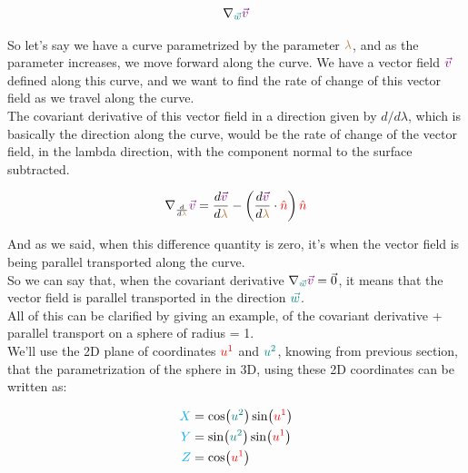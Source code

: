 \begin{equation}
    \nabla_{\begingroup\color{teal}\vec{w}\endgroup}\begingroup\color{violet}\vec{v}\endgroup
\end{equation}

So let's say we have a curve parametrized by the parameter $\color{brown}\lambda$, and as the parameter increases, we move forward along the curve. We have a vector field
$\color{violet}\vec{v}$ defined along this curve, and we want to find the rate of change of this vector field as we travel along the curve.\\

The covariant derivative of this vector field in a direction given by $d/d\lambda$, which is basically the direction 
along the curve, would be the rate of change of the vector field, in the lambda direction, with the component normal to the surface subtracted.

\begin{equation}
    \nabla_{\frac{d}{d\begingroup\color{brown}\lambda\endgroup}}\begingroup\color{violet}\vec{v}\endgroup = \frac{d\begingroup\color{violet}\vec{v}\endgroup}{d\begingroup\color{brown}\lambda\endgroup} -
    \left(\frac{d \begingroup\color{violet}\vec{v}\endgroup}{d \begingroup\color{brown}\lambda\endgroup} \cdot \begingroup\color{red}\hat{n}\endgroup\right)\begingroup\color{red}\hat{n}\endgroup
\end{equation}

And as we said, when this difference quantity is zero, it's when the vector field is being parallel transported along the curve.\\

So we can say that, when the covariant derivative $\nabla_{\begingroup\color{teal}\vec{w}\endgroup}\begingroup\color{violet}\vec{v}\endgroup = \vec{0}$, it means
that the vector field is parallel transported in the direction $\color{teal}\vec{w}$.\\

All of this can be clarified by giving an example, of the covariant derivative + parallel transport on a sphere of radius = 1.\\
We'll use the 2D plane of coordinates $\color{red}u^1$ and $\color{teal}u^2$, knowing from previous section, that the parametrization
of the sphere in 3D, using these 2D coordinates can be written as:

\begin{align*}
    \begingroup\color{cyan}X\endgroup &= \cos(\begingroup\color{teal}u^2\endgroup)\sin(\begingroup\color{red}u^1\endgroup)\\
    \begingroup\color{cyan}Y\endgroup &= \sin(\begingroup\color{teal}u^2\endgroup)\sin(\begingroup\color{red}u^1\endgroup)\\
    \begingroup\color{cyan}Z\endgroup &= \cos(\begingroup\color{red}u^1\endgroup)
\end{align*}

